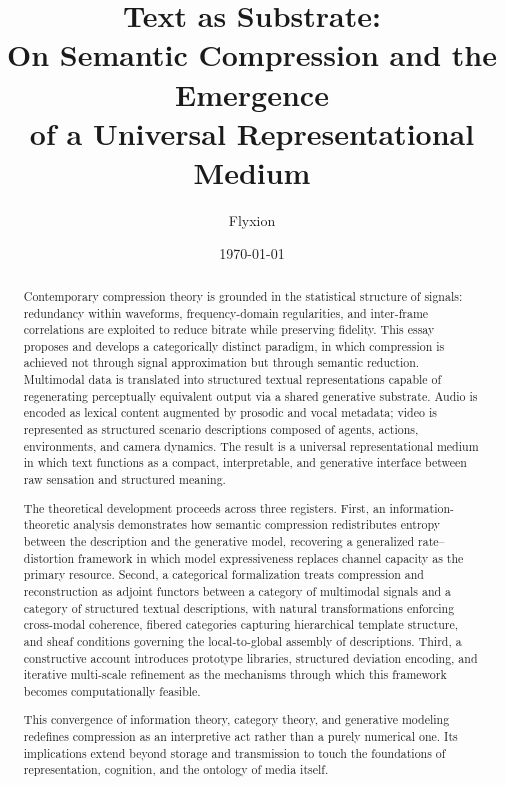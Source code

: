 \documentclass[12pt,a4paper]{article}
\title{Text as Substrate:\\
On Semantic Compression and the Emergence\\
of a Universal Representational Medium}
\author{Flyxion}
\date{\today}
\theoremstyle{definition}
\theoremstyle{remark}
\begin{document}
\maketitle

\begin{abstract}
Contemporary compression theory is grounded in the statistical structure of signals: redundancy within waveforms, frequency-domain regularities, and inter-frame correlations are exploited to reduce bitrate while preserving fidelity. This essay proposes and develops a categorically distinct paradigm, in which compression is achieved not through signal approximation but through semantic reduction. Multimodal data is translated into structured textual representations capable of regenerating perceptually equivalent output via a shared generative substrate. Audio is encoded as lexical content augmented by prosodic and vocal metadata; video is represented as structured scenario descriptions composed of agents, actions, environments, and camera dynamics. The result is a universal representational medium in which text functions as a compact, interpretable, and generative interface between raw sensation and structured meaning.

The theoretical development proceeds across three registers. First, an information-theoretic analysis demonstrates how semantic compression redistributes entropy between the description and the generative model, recovering a generalized rate--distortion framework in which model expressiveness replaces channel capacity as the primary resource. Second, a categorical formalization treats compression and reconstruction as adjoint functors between a category of multimodal signals and a category of structured textual descriptions, with natural transformations enforcing cross-modal coherence, fibered categories capturing hierarchical template structure, and sheaf conditions governing the local-to-global assembly of descriptions. Third, a constructive account introduces prototype libraries, structured deviation encoding, and iterative multi-scale refinement as the mechanisms through which this framework becomes computationally feasible.

This convergence of information theory, category theory, and generative modeling redefines compression as an interpretive act rather than a purely numerical one. Its implications extend beyond storage and transmission to touch the foundations of representation, cognition, and the ontology of media itself.
\end{abstract}
\end{document}
